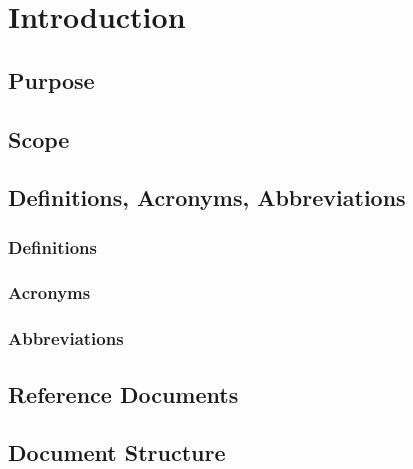\chapter{Introduction}

\section{Purpose}

\section{Scope}

\section{Definitions, Acronyms, Abbreviations}
\subsection{Definitions}
\subsection{Acronyms}
\subsection{Abbreviations}

\section{Reference Documents}

\section{Document Structure}